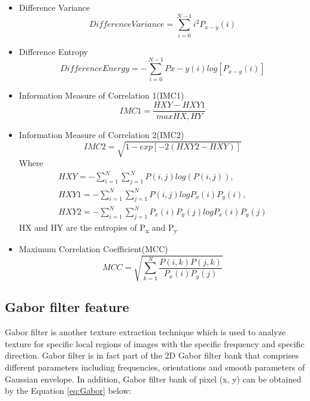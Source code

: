 \documentclass[review]{elsarticle}
\begin{document}
\begin{itemize}
	\item Difference Variance 
	\begin{equation}
	Difference Variance = \sum_{i=0}^{N-1}i^2 P_{x-y}(i)
	\end{equation}

	\item Difference Entropy 
	\begin{equation}
	Difference Energy= - \sum_{i=0}^{N-1} P{x-y}(i) log [P_{x-y}(i)]
	\end{equation}
	
	\item Information Measure of Correlation 1(IMC1)
	\begin{equation}
	IMC1= \dfrac{HXY-HXY1}{max{HX,HY}}
	\end{equation}
	
	\item Information Measure of Correlation 2(IMC2)
	\begin{equation}
	IMC2=\sqrt{ 1-exp[-2(HXY2-HXY)]}
	\end{equation}
	Where 
	\begin{equation}
	\begin{split}
	HXY=- \sum_{i=1}^N \sum_{j=1}^N P(i,j) log(P(i,j)),\\
	HXY1= -\sum_{i=1}^N \sum_{j=1}^N P(i,j) log{P_x(i)P_y(i)},\\
	HXY2=-\sum_{i=1}^N \sum_{j=1}^N P_x(i)P_y(j) log{P_x(i)P_y(j)}
	\end{split}
	\end{equation}
	HX and HY are the entropies of P\textsubscript{x} and P\textsubscript{y}
	
	\item Maximum Correlation Coefficient(MCC) 
	\begin{equation}
	MCC= \sqrt{\sum_{k=1}^N \dfrac{P(i,k)P(j,k)}{P_x(i)P_y(j)}}
	\end{equation}
\end{itemize}


\subsection{Gabor filter feature}
\label{subsec:gabor}
Gabor filter is another texture extraction technique which is used to analyze texture for specific local regions of images with the specific frequency and specific direction. Gabor filter is in fact part of the 2D Gabor filter bank that comprises different parameters including frequencies, orientations and smooth parameters of Gaussian envelope. In addition, Gabor filter bank of pixel (x, y) can be obtained by the Equation \ref{eq:Gabor} below:
\end{document}
